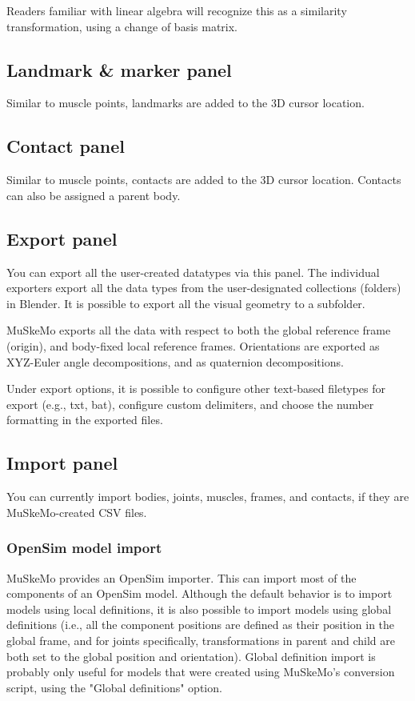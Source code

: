 \documentclass{article}
\begin{document}
Readers familiar with linear algebra will recognize this as a similarity transformation, using a change of basis matrix.

\subsection{Landmark \& marker panel}

Similar to muscle points, landmarks are added to the 3D cursor location.

\subsection{Contact panel}

Similar to muscle points, contacts are added to the 3D cursor location. Contacts can also be assigned a parent body.

\subsection{Export panel}
\label{sec:exportpanel}
You can export all the user-created datatypes via this panel. The individual exporters export all the data types from the user-designated collections (folders) in Blender. It is possible to export all the visual geometry to a subfolder.

MuSkeMo exports all the data with respect to both the global reference frame (origin), and body-fixed local reference frames. Orientations are exported as XYZ-Euler angle decompositions, and as quaternion decompositions.

Under export options, it is possible to configure other text-based filetypes for export (e.g., txt, bat), configure custom delimiters, and choose the number formatting in the exported files.


\subsection{Import panel}

You can currently import bodies, joints, muscles, frames, and contacts, if they are MuSkeMo-created CSV files.

\subsubsection{OpenSim model import}
\label{sec:opensimimporter}
MuSkeMo provides an OpenSim importer. This can import most of the components of an OpenSim model. Although the default behavior is to import models using local definitions, it is also possible to import models using global definitions (i.e., all the component positions are defined as their position in the global frame, and for joints specifically, transformations in parent and child are both set to the global position and orientation). Global definition import is probably only useful for models that were created using MuSkeMo's conversion script, using the "Global definitions" option.
\end{document}
